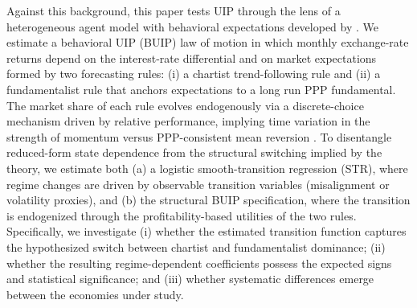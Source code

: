 \documentclass[a4paper,10pt,final]{article}    %
\begin{document}
Against this background, this paper tests UIP through the lens of a heterogeneous agent model with behavioral expectations developed by \citet{Proano2011,proano2013monetary}. We estimate a behavioral UIP (BUIP) law of motion in which monthly exchange-rate returns depend on the interest-rate differential and on market expectations formed by two forecasting rules: (i) a chartist trend-following rule and (ii) a fundamentalist rule that anchors expectations to a long run PPP fundamental. The market share of each rule evolves endogenously via a discrete-choice mechanism driven by relative performance, implying time variation in the strength of momentum versus PPP-consistent mean reversion \citep{BrockHommes1997,Proano2011,proano2013monetary}. To disentangle reduced-form state dependence from the structural switching implied by the theory, we estimate both (a) a logistic smooth-transition regression (STR), where regime changes are driven by observable transition variables (misalignment or volatility proxies), and (b) the structural BUIP specification, where the transition is endogenized through the profitability-based utilities of the two rules. Specifically, we investigate (i) whether the estimated transition function
captures the hypothesized switch between chartist and fundamentalist dominance; (ii) whether the
resulting regime-dependent coefficients possess the expected signs and statistical significance; and (iii)
whether systematic differences emerge between the economies under study.
\end{document}
